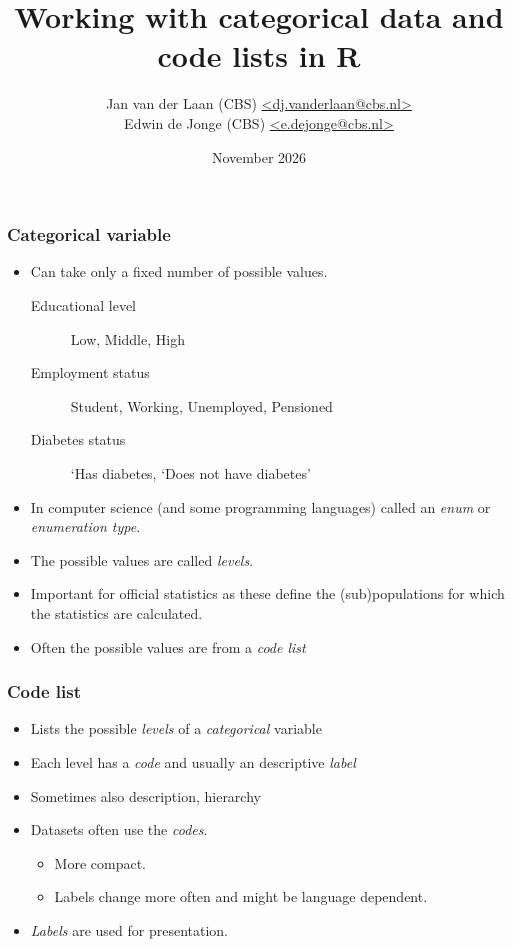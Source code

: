 \documentclass[aspectratio=1610]{beamer}
\title{Working with categorical data and \\code lists in R}
\author{Jan van der Laan (CBS) \url{<dj.vanderlaan@cbs.nl>}\\Edwin de Jonge (CBS) \url{<e.dejonge@cbs.nl>}}
\date{November 2026}
\institute{uRos November 2026}
\begin{document}
\begin{frame}
  \titlepage
\end{frame}

\begin{frame}
  \frametitle{Categorical variable}
  \begin{itemize}
    \item Can take only a fixed number of possible values.
    \begin{description}
      \item[Educational level] Low, Middle, High
      \item[Employment status] Student, Working, Unemployed, Pensioned
      \item[Diabetes status] `Has diabetes, `Does not have diabetes'
    \end{description}
    \item In computer science (and some programming languages) called an \emph{enum} or 
      \textit{enumeration type}. 
    \item The possible values are called \emph{levels}.
    \item Important for official statistics as these define the
      (sub)populations for which the statistics are calculated.
    \item Often the possible values are from a \emph{code list}
  \end{itemize}
\end{frame}

\begin{frame}
  \frametitle{Code list}
  \begin{itemize}
    \item Lists the possible \emph{levels} of a \emph{categorical} variable
    \item Each level has a \emph{code} and usually an descriptive \emph{label}
    \item Sometimes also description, hierarchy
    \item Datasets often use the \emph{codes}.
      \begin{itemize}
        \item More compact.
        \item Labels change more often and might be language dependent.
      \end{itemize}
    \item \emph{Labels} are used for presentation.
  \end{itemize}
\end{frame}
\end{document}
